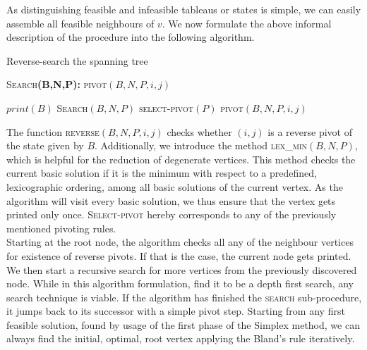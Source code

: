 \documentclass[a4paper, 11pt]{article}
\begin{document}
As distinguishing feasible and infeasible tableaus or states is simple, we can easily assemble all feasible neighbours of $v$. We now formulate the above informal description of the procedure into the following algorithm.

\begin{algorithm}[H]
	\caption{Reverse-search the spanning tree}
	\label{alg:seq}
	\begin{algorithmic}[1]
		\STATE \textsc{Search}\textbf{(B,N,P):}
		\STATE \textsc{pivot}$(B,N,P,i,j)$
		
		\STATE $print(B)$
		\ENDIF
		\STATE \textsc{Search}$(B,N,P)$
		\STATE \textsc{select-pivot}$(P)$
		\STATE \textsc{pivot}$(B,N,P,i,j)$
		
		\ENDIF
		\ENDFOR
	\end{algorithmic}
\end{algorithm}

The function \textsc{reverse}$(B,N,P,i,j)$ checks  whether $(i,j)$ is a reverse pivot of the state given by $B$. Additionally, we introduce the method \textsc{lex\_min}$(B,N,P)$, which is helpful for the reduction of degenerate vertices. This method checks the current basic solution if it is the minimum with respect to a predefined, lexicographic ordering, among all basic solutions of the current vertex. As the algorithm will visit every basic solution, we thus ensure that the vertex gets printed only once. \textsc{Select-pivot} hereby corresponds to any of the previously mentioned pivoting rules.\\ 

Starting at the root node, the algorithm checks all any of the neighbour vertices for existence of reverse pivots. If that is the case, the current node gets printed. We then start a recursive search for more vertices from the previously discovered node. While in this algorithm formulation, find it to be a depth first search, any search technique is viable. If the algorithm has finished the \textsc{search} sub-procedure, it jumps back to its successor with a simple pivot step. Starting from any first feasible solution, found by usage of the first phase of the Simplex method, we can always find the initial, optimal, root vertex applying the Bland's rule iteratively.\\
\end{document}

